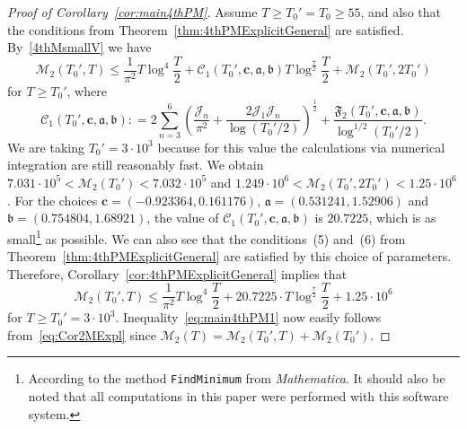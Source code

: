 \documentclass[a4paper,reqno]{amsart}
\theoremstyle{definition}
\newcommand{\de}[0]{\mathrel{\mathop:}=}
\begin{document}
\begin{proof}[Proof of Corollary~\ref{cor:main4thPM}]
Assume $T\geq T_0'=T_0\geq 55$, and also that the conditions from Theorem~\ref{thm:4thPMExplicitGeneral} are satisfied. By~\eqref{4thMsmallV} we have
\begin{equation*}
\mathcal{M}_{2}(T_0',T) \leq \frac{1}{\pi^2}T\log^{4}{\frac{T}{2}} + \mathcal{C}_{1}\left(T_0',\bm{c},\bm{\mathfrak{a}},\bm{\mathfrak{b}}\right)T\log^{\frac{7}{2}}{\frac{T}{2}} + \mathcal{M}_{2}(T_0',2T_0')
\end{equation*}
for $T\geq T_0'$, where
\[
\mathcal{C}_{1}\left(T_0',\bm{c},\bm{\mathfrak{a}},\bm{\mathfrak{b}}\right) \de 2\sum_{n=3}^{6}\left(\frac{\mathcal{J}_{n}}{\pi^2}+\frac{2\mathcal{J}_{1}\mathcal{J}_{n}}{\log{(T_0'/2)}}\right)^{\frac{1}{2}} + \frac{\mathfrak{F}_{2}\left(T_0',\bm{c},\bm{\mathfrak{a}},\bm{\mathfrak{b}}\right)}{\log^{1/2}{(T_0'/2)}}.
\]
We are taking $T_0'=3\cdot 10^{3}$ because for this value the calculations via numerical integration are still reasonably fast. We obtain $7.031\cdot 10^5<\mathcal{M}_2(T_0') < 7.032\cdot 10^5$ and $1.249\cdot 10^6<\mathcal{M}_2(T_0',2T_0')<1.25\cdot 10^6$. For the choices $\bm{c}=(-0.923364,0.161176)$, $\bm{\mathfrak{a}}=(0.531241,1.52906)$ and $\bm{\mathfrak{b}}=(0.754804,1.68921)$, the value of $\mathcal{C}_{1}(T_0',\bm{c},\bm{\mathfrak{a}},\bm{\mathfrak{b}})$ is $20.7225$, which is as small\footnote{According to the method \texttt{FindMinimum} from \emph{Mathematica}. It should also be noted that all computations in this paper were performed with this software system.} as possible. We can also see that the conditions~(5) and~(6) from Theorem~\ref{thm:4thPMExplicitGeneral} are satisfied by this choice of parameters. Therefore, Corollary~\ref{cor:4thPMExplicitGeneral} implies that
\begin{equation}
\label{eq:Cor2MExpl}
\mathcal{M}_{2}\left(T_0',T\right) \leq \frac{1}{\pi^2}T\log^{4}{\frac{T}{2}} + 20.7225\cdot T\log^{\frac{7}{2}}{\frac{T}{2}} + 1.25\cdot 10^6
\end{equation}
for $T\geq T_0'=3\cdot 10^3$. Inequality~\eqref{eq:main4thPM1} now easily follows from~\eqref{eq:Cor2MExpl} since $\mathcal{M}_{2}(T)=\mathcal{M}_{2}\left(T_0',T\right)+\mathcal{M}_{2}\left(T_0'\right)$.


\end{proof}
\end{document}
